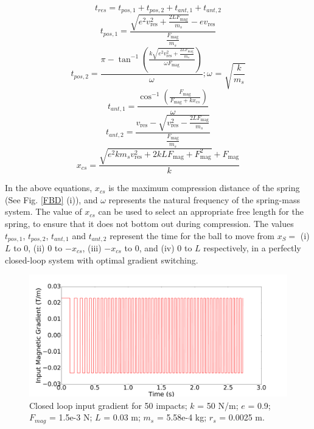 \documentclass[letterpaper, 10 pt, conference]{ieeeconf}  %
\begin{document}
\begin{equation}
t_{res}=t_{pos,1}+t_{pos,2}+t_{ant,1}+t_{ant,2}
\label{tres6}
\end{equation}	
\begin{equation}
t_{pos,1}=\frac{\sqrt{e^2 v_{\text{res}}^2+\frac{2 L F_{\text{mag}}}{m_s}}-e v_{\text{res}}}{\frac{F_{\text{mag}}}{m_s}}
\label{tres1}
\end{equation}
\begin{equation}
t_{pos,2}=\frac{\pi -\tan ^{-1}\left(\frac{k \sqrt{e^2 v_{\text{res}}^2+\frac{2 L F_{\text{mag}}}{m_s}}}{\omega  F_{\text{mag}}}\right)}{\omega } ; \text{$\omega $ = }
\sqrt{\frac{k}{m_s}}
\label{tres2}
\end{equation}
\begin{equation}
t_{ant,1}=\frac{\cos ^{-1}\left(\frac{F_{\text{mag}}}{F_{\text{mag}}+k x_{cs}}\right)}{\omega }
\label{tres3}
\end{equation}
\begin{equation}
t_{ant,2}=\frac{v_{\text{res}}-\sqrt{v_{\text{res}}^2-\frac{2 L F_{\text{mag}}}{m_s}}}{\frac{F_{\text{mag}}}{m_s}}
\label{tres4}
\end{equation}
\begin{equation}
x_{cs}=\frac{\sqrt{e^2 k m_s v_{\text{res}}^2+2 k L F_{\text{mag}}+F_{\text{mag}}^2}+F_{\text{mag}}}{k}
\label{tres5}
\end{equation}


In the above equations, $x_{cs}$ is the maximum compression distance of the spring (See Fig. \ref{FBD} (i)), and $\omega$ represents the natural frequency of the spring-mass system. The value of $x_{cs}$ can be used to select an appropriate free length for the spring, to ensure that it does not bottom out during compression. The values $t_{pos,1}$, $t_{pos,2}$, $t_{ant,1}$ and $t_{ant,2}$ represent the time for the ball to move from $x_S =$ (i) $L$ to 0, (ii) 0 to $-x_{cs}$, (iii) $-x_{cs}$ to 0, and (iv) 0 to $L$ respectively, in a perfectly closed-loop system with optimal gradient switching.



\begin{figure}
	\includegraphics[width=\linewidth]{CLinput.pdf}
	\caption{Closed loop input gradient for 50 impacts; $k$ = 50 N/m; $e$ = 0.9; $F_{mag}$ = 1.5e-3 N; $L$ = 0.03 m; $m_s$ = 5.58e-4 kg; $r_s$ = 0.0025 m.}
	\label{CLinput}
	
\end{figure}
\end{document}
